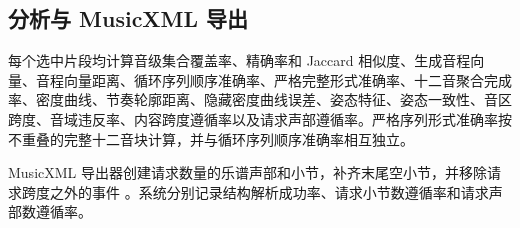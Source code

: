 \subsection{分析与 MusicXML 导出}

每个选中片段均计算音级集合覆盖率、精确率和 Jaccard 相似度、生成音程向量、音程向量距离、循环序列顺序准确率、严格完整形式准确率、十二音聚合完成率、密度曲线、节奏轮廓距离、隐藏密度曲线误差、姿态特征、姿态一致性、音区跨度、音域违反率、内容跨度遵循率以及请求声部遵循率。严格序列形式准确率按不重叠的完整十二音块计算，并与循环序列顺序准确率相互独立。

MusicXML 导出器创建请求数量的乐谱声部和小节，补齐末尾空小节，并移除请求跨度之外的事件 \citep{musicxml2021spec}。系统分别记录结构解析成功率、请求小节数遵循率和请求声部数遵循率。
